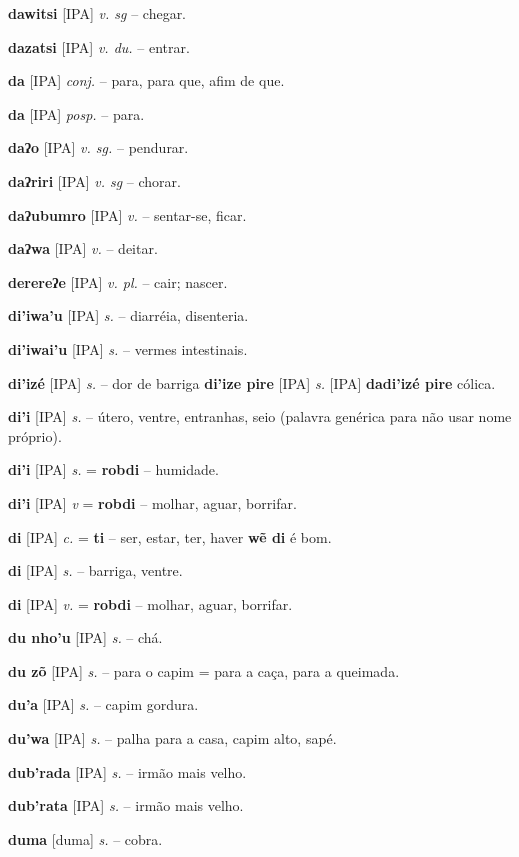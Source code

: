 \textbf{dawitsi} [IPA] \textit{v. sg} -- chegar.

\textbf{dazatsi} [IPA] \textit{v. du.} -- entrar.

\textbf{da} [IPA] \textit{conj.} -- para, para que, afim de que.

\textbf{da} [IPA] \textit{posp.} -- para.

\textbf{daʔo} [IPA] \textit{v. sg.} -- pendurar.

\textbf{daʔriri} [IPA] \textit{v. sg} -- chorar.

\textbf{daʔubumro} [IPA] \textit{v.} -- sentar-se, ficar.

\textbf{daʔwa} [IPA] \textit{v.} -- deitar.

\textbf{derereʔe} [IPA] \textit{v. pl.} -- cair; nascer.

\textbf{di'iwa'u} [IPA] \textit{s.} -- diarréia, disenteria.

\textbf{di'iwai'u} [IPA] \textit{s.} -- vermes intestinais.

\textbf{di'izé} [IPA] \textit{s.} -- dor de barriga  \textbf{di'ize pire} [IPA] \textit{s.} [IPA] \textbf{dadi'izé pire} cólica.

\textbf{di'i} [IPA] \textit{s.} -- útero, ventre, entranhas, seio (palavra genérica para não usar nome próprio).

\textbf{di'i} [IPA] \textit{s.} = \textbf{robdi} -- humidade.

\textbf{di'i} [IPA] \textit{v} = \textbf{robdi} -- molhar, aguar, borrifar.

\textbf{di} [IPA] \textit{c.} = \textbf{ti} -- ser, estar, ter, haver  \textbf{wẽ di} é bom.

\textbf{di} [IPA] \textit{s.} -- barriga, ventre.

\textbf{di} [IPA] \textit{v.} = \textbf{robdi} -- molhar, aguar, borrifar.

\textbf{du nho'u} [IPA] \textit{s.} -- chá.

\textbf{du zõ} [IPA] \textit{s.} -- para o capim = para a caça, para a queimada.

\textbf{du'a} [IPA] \textit{s.} -- capim gordura.

\textbf{du'wa} [IPA] \textit{s.} -- palha para a casa, capim alto, sapé.

\textbf{dub'rada} [IPA] \textit{s.} -- irmão mais velho.

\textbf{dub'rata} [IPA] \textit{s.} -- irmão mais velho.

\textbf{duma} [duma] \textit{s.} -- cobra.

